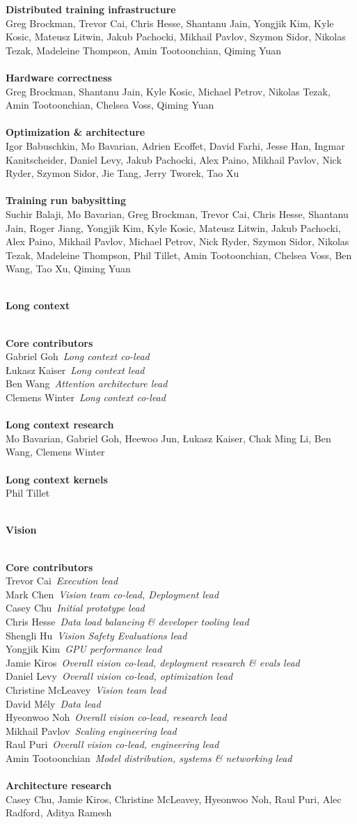 \documentclass{article}
\newcommand{\creditsectionheader}[1]{\parbox{\columnwidth}{\centering \textbf{\small #1}}\\}
\newcommand{\creditlistheader}[1]{\textbf{#1}\footnotemark[\thefootnote]\\}
\newcommand{\creditlist}[2]{\creditlistheader{#1}#2\\
\\}
\newcommand{\corecontributor}[2]{#1\ \textit{#2}\\}
\begin{document}
\begin{multicols}{2}
\creditlist{Distributed training infrastructure}{Greg Brockman, Trevor Cai, Chris Hesse, Shantanu Jain, Yongjik Kim, Kyle Kosic, Mateusz Litwin, Jakub Pachocki, Mikhail Pavlov, Szymon Sidor, Nikolas Tezak, Madeleine Thompson, Amin Tootoonchian, Qiming Yuan}
\creditlist{Hardware correctness}{Greg Brockman, Shantanu Jain, Kyle Kosic, Michael Petrov, Nikolas Tezak, Amin Tootoonchian, Chelsea Voss, Qiming Yuan}
\creditlist{Optimization \& architecture}{
Igor Babuschkin, Mo Bavarian, Adrien Ecoffet, David Farhi, Jesse Han, Ingmar Kanitscheider, Daniel Levy, Jakub Pachocki, Alex Paino, Mikhail Pavlov, Nick Ryder, Szymon Sidor, Jie Tang, Jerry Tworek, Tao Xu}
\creditlist{Training run babysitting}{
Suchir Balaji, Mo Bavarian, Greg Brockman, Trevor Cai, Chris Hesse, Shantanu Jain, Roger Jiang, Yongjik Kim, Kyle Kosic, Mateusz Litwin, Jakub Pachocki, Alex Paino, Mikhail Pavlov, Michael Petrov, Nick Ryder, Szymon Sidor, Nikolas Tezak, Madeleine Thompson, Phil Tillet, Amin Tootoonchian, Chelsea Voss, Ben Wang, Tao Xu, Qiming Yuan}
\creditsectionheader{Long context}
\creditlistheader{Core contributors}
\corecontributor{Gabriel Goh}{Long context co-lead}
\corecontributor{Łukasz Kaiser}{Long context lead}
\corecontributor{Ben Wang}{Attention architecture lead}
\corecontributor{Clemens Winter}{Long context co-lead}
\\
\creditlist{Long context research}{Mo Bavarian, Gabriel Goh, Heewoo Jun, Łukasz Kaiser, Chak Ming Li, Ben Wang, Clemens Winter}
\creditlist{Long context kernels}{Phil Tillet}
\creditsectionheader{Vision}
\creditlistheader{Core contributors}
\corecontributor{Trevor Cai}{Execution lead}
\corecontributor{Mark Chen}{Vision team co-lead, Deployment lead}
\corecontributor{Casey Chu}{Initial prototype lead}
\corecontributor{Chris Hesse}{Data load balancing \& developer tooling lead}
\corecontributor{Shengli Hu}{Vision Safety Evaluations lead}
\corecontributor{Yongjik Kim}{GPU performance lead}
\corecontributor{Jamie Kiros}{Overall vision co-lead, deployment research \& evals lead}
\corecontributor{Daniel Levy}{Overall vision co-lead, optimization lead}
\corecontributor{Christine McLeavey}{Vision team lead}
\corecontributor{David Mély}{Data lead}
\corecontributor{Hyeonwoo Noh}{Overall vision co-lead, research lead}
\corecontributor{Mikhail Pavlov}{Scaling engineering lead}
\corecontributor{Raul Puri}{Overall vision co-lead, engineering lead}
\corecontributor{Amin Tootoonchian}{Model distribution, systems \& networking lead}
\\
\creditlist{Architecture research}{Casey Chu, Jamie Kiros, Christine McLeavey, Hyeonwoo Noh, Raul Puri, Alec Radford, Aditya Ramesh}

\end{multicols}
\end{document}

